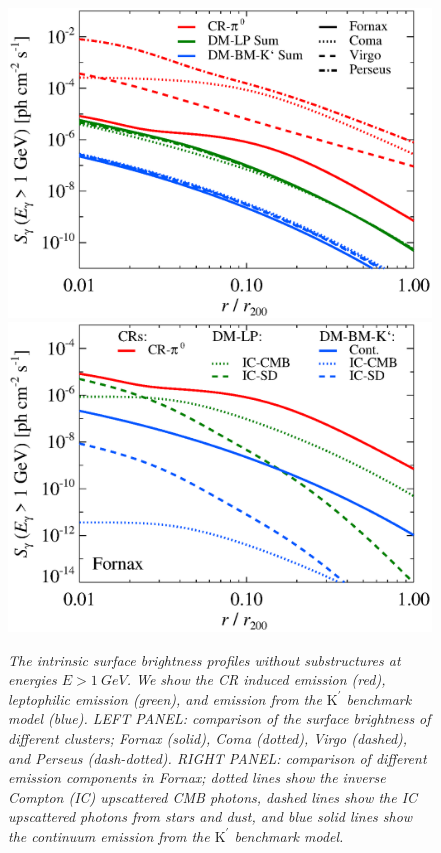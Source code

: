 \documentclass[10pt,aps,pra,reprint,amsmath,amsfonts,amssymb,showpacs,nofootinbib,floatfix]{revtex4-1}
\newcommand{\rmn}{\mathrm}
\newcommand{\Kp}{\rmn{K}^\prime}
\begin{document}
\begin{figure}
\begin{minipage}{2.0\columnwidth}
  \includegraphics[width=0.49\columnwidth]{figures/SB.v14.1GeV.SF700.noSuB.elmu.eps}
  \includegraphics[width=0.49\columnwidth]{figures/SB.fornax.v14.1GeV.SF700.noSuB.elmu.eps}
  \caption{\it The intrinsic surface brightness profiles without
    substructures at energies $E>1\ GeV$. We show the CR induced
    emission (red), leptophilic emission (green), and emission from
    the $\Kp$ benchmark model (blue).  LEFT PANEL: comparison of the surface
    brightness of different clusters; Fornax (solid), Coma (dotted),
    Virgo (dashed), and Perseus (dash-dotted). RIGHT PANEL: comparison of
    different emission components in Fornax; dotted lines show the
    inverse Compton (IC) upscattered CMB photons, dashed lines show
    the IC upscattered photons from stars and dust, and blue solid
    lines show the continuum emission from the $\Kp$ benchmark model.}
 \label{fig:SB_clu_nosub}
\end{minipage}
\end{figure}
\end{document}
